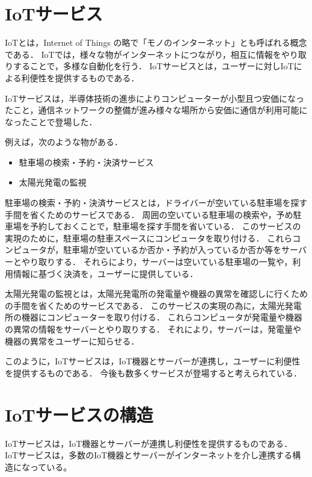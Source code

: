 \section{IoTサービス}
IoTとは，Internet of Things の略で「モノのインターネット」とも呼ばれる概念である．
IoTでは，様々な物がインターネットにつながり，相互に情報をやり取りすることで，多様な自動化を行う．
IoTサービスとは，ユーザーに対しIoTによる利便性を提供するものである．
\medskip

IoTサービスは，半導体技術の進歩によりコンピューターが小型且つ安価になったこと，通信ネットワークの整備が進み様々な場所から安価に通信が利用可能になったことで登場した．
\medskip

例えば，次のような物がある．
\begin{itemize}
	\item 駐車場の検索・予約・決済サービス\cite{エコパ}
	\item 太陽光発電の監視
\end{itemize}

駐車場の検索・予約・決済サービスとは，ドライバーが空いている駐車場を探す手間を省くためのサービスである．
周囲の空いている駐車場の検索や，予め駐車場を予約しておくことで，駐車場を探す手間を省いている．
このサービスの実現のために，駐車場の駐車スペースにコンピュータを取り付ける．
これらコンピュータが，駐車場が空いているか否か・予約が入っているか否か等をサーバーとやり取りする．
それらにより，サーバーは空いている駐車場の一覧や，利用情報に基づく決済を，ユーザーに提供している．
\medskip

太陽光発電の監視とは，太陽光発電所の発電量や機器の異常を確認しに行くための手間を省くためのサービスである．
このサービスの実現の為に，太陽光発電所の機器にコンピューターを取り付ける．
これらコンピュータが発電量や機器の異常の情報をサーバーとやり取りする．
それにより，サーバーは，発電量や機器の異常をユーザーに知らせる．
\medskip

このように，IoTサービスは，IoT機器とサーバーが連携し，ユーザーに利便性を提供するものである．
今後も数多くサービスが登場すると考えられている．

\section{IoTサービスの構造}
IoTサービスは，IoT機器とサーバーが連携し利便性を提供するものである．
IoTサービスは，多数のIoT機器とサーバーがインターネットを介し連携する構造になっている。
\medskip

